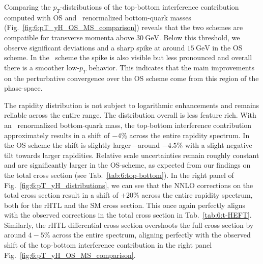 Comparing the $p_T$-distributions of the top-bottom interference contribution computed with \acs{OS} and \MS\ renormalized bottom-quark masses (Fig.~\ref{fig:6:pT_yH_OS_MS_comparison}) reveals that the two schemes are compatible for transverse momenta above $30\ \mathrm{GeV}$. Below this threshold, we observe significant deviations and a sharp spike at around $15\ \mathrm{GeV}$ in the \acs{OS} scheme. In the \MS\ scheme the spike is also visible but less pronounced and overall there is a smoother low-$p_T$ behavior. This indicates that the main improvements on the perturbative convergence over the \acs{OS} scheme come from this region of the phase-space.

The rapidity distribution is not subject to logarithmic enhancements and remains reliable across the entire range. The distribution overall is less feature rich. With an \MS\ renormalized bottom-quark mass, the top-bottom interference contribution approximately results in a shift of $-4\%$ across the entire rapidity spectrum. In the \acs{OS} scheme the shift is slightly larger---around $-4.5\%$ with a slight negative tilt towards larger rapidities. Relative scale uncertainties remain roughly constant and are significantly larger in the \acs{OS}-scheme, as expected from our findings on the total cross section (see Tab.~\ref{tab:6:top-bottom}). In the right panel of Fig.~\ref{fig:6:pT_yH_distributions}, we can see that the \acs{NNLO} corrections on the total cross section result in a shift of $+20\%$ across the entire rapidity spectrum, both for the \acs{rHTL} and the \acs{SM} cross section. This once again perfectly aligns with the observed corrections in the total cross section in Tab.~\ref{tab:6:t-HEFT}. Similarly, the \acs{rHTL} differential cross section overshoots the full cross section by around $4-5\%$ across the entire spectrum, aligning perfectly with the observed shift of the top-bottom interference contribution in the right panel Fig.~\ref{fig:6:pT_yH_OS_MS_comparison}.

